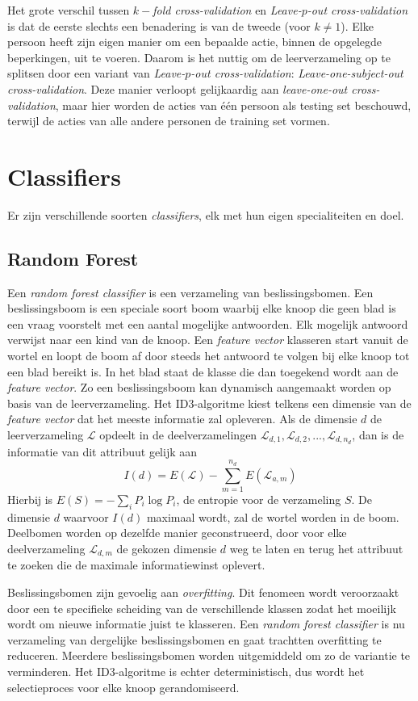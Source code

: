 Het grote verschil tussen \textit{$k-$fold cross-validation} en \textit{Leave-$p$-out cross-validation}  is dat de eerste slechts een benadering is van de tweede (voor $k \neq 1$).  Elke persoon heeft zijn eigen manier om een bepaalde actie, binnen de opgelegde beperkingen, uit te voeren. Daarom is het nuttig om de leerverzameling op te splitsen door een variant van \textit{Leave-$p$-out cross-validation}: \textit{Leave-one-subject-out cross-validation}. Deze manier verloopt gelijkaardig aan \textit{leave-one-out cross-validation}, maar hier worden de acties van één persoon als testing set beschouwd, terwijl de acties van alle andere personen de training set vormen.


\section{Classifiers}
Er zijn verschillende soorten \textit{classifiers}, elk met hun eigen specialiteiten en doel.
\subsection{Random Forest}
Een \textit{random forest classifier} is een verzameling van beslissingsbomen. Een beslissingsboom is een speciale soort boom waarbij elke knoop die geen blad is een vraag voorstelt met een aantal mogelijke antwoorden. Elk mogelijk antwoord verwijst naar een kind van de knoop. Een \textit{feature vector} klasseren start vanuit de wortel en loopt de boom af door steeds het antwoord te volgen bij elke knoop tot een blad bereikt is. In het blad staat de klasse die dan toegekend wordt aan de \textit{feature vector}. Zo een beslissingsboom kan dynamisch aangemaakt worden op basis van de leerverzameling. Het ID3-algoritme kiest telkens een dimensie van de \textit{feature vector} dat het meeste informatie zal opleveren. Als de dimensie $d$ de leerverzameling $\mathcal{L}$ opdeelt in de deelverzamelingen $\mathcal{L}_{d, 1}, \mathcal{L}_{d, 2}, ..., \mathcal{L}_{d, n_d}$, dan is de informatie van dit attribuut gelijk aan
$$I(d) = E(\mathcal{L}) - \sum_{m=1}^{n_d} E(\mathcal{L}_{a,m})$$
Hierbij is $E(S) = -\sum_{i}P_i\log P_i$, de entropie voor de verzameling $S$.
De dimensie $d$ waarvoor $I(d)$ maximaal wordt, zal de wortel worden in de boom. Deelbomen worden op dezelfde manier geconstrueerd, door voor elke deelverzameling $\mathcal{L}_{d, m}$ de gekozen dimensie $d$ weg te laten en terug het attribuut te zoeken die de maximale informatiewinst oplevert.

Beslissingsbomen zijn gevoelig aan \textit{overfitting}. Dit fenomeen wordt veroorzaakt door een te specifieke scheiding van de verschillende klassen zodat het moeilijk wordt om nieuwe informatie juist te klasseren. Een \textit{random forest classifier} is nu verzameling van dergelijke beslissingsbomen en gaat trachtten overfitting te reduceren. Meerdere beslissingsbomen worden uitgemiddeld om zo de variantie te verminderen. Het ID3-algoritme is echter deterministisch, dus wordt het selectieproces voor elke knoop gerandomiseerd.



